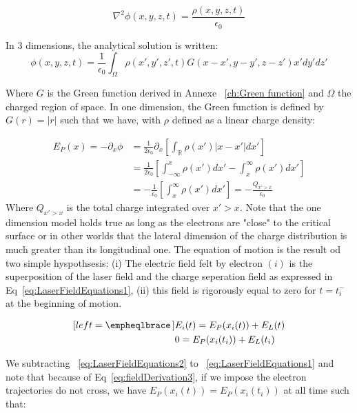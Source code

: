 \begin{equation}
\nabla^2 \phi(x,y,z,t) = \frac{\rho(x,y,z,t)}{\epsilon_0}
\end{equation}

\noindent In 3 dimensions, the analytical solution is written:
$$
\phi(x,y,z,t) =  \frac{1}{\epsilon_0}\int_{\Omega}\rho(x',y',z',t)G(x-x',y-y',z-z')x'dy'dz'
$$

\noindent Where $G$  is the Green function derived in Annexe ~\ref{ch:Green function}  and $\Omega$ the charged region of space. 
In one dimension, the Green function is defined by $G(r) = |r|$ such that we have, with $\rho$ defined as a linear charge density:

\begin{align}
\label{eq:fieldDerivation}
E_P(x) = -\partial_x\phi & =  \frac{1}{2\epsilon_0}\partial_x[\int_{\mathbb{R}}\rho(x')|x-x'|dx'] \\
                                   & =  \frac{1}{2\epsilon_0}[\int_{-\infty}^{x}\rho(x')dx'-\int_{x}^{\infty}\rho(x')dx']\\
                                   & =  -\frac{1}{\epsilon_0}[\int_{x}^{\infty}\rho(x')dx']=  -\frac{Q_{x'>x}}{\epsilon_0} \label{eq:fieldDerivation3}
\end{align}
\noindent Where $Q_{x'>x}$ is the total charge integrated over $x'>x$.
\noindent Note that the one dimension model holds true as long as the electrons are "close" to the critical surface or in other worlds that the lateral dimension of the charge distribution is much greater than its longitudinal one. The equation of motion is the result od two simple hyspothsesis:
(i) The electric field felt by electron $(i)$ is the superposition of the laser field and the charge seperation field as expressed in Eq~\ref{eq:LaserFieldEquations1}, (ii) this field is rigorously equal to zero for $t = t_i^{-}$ at the beginning of motion.
\begin{minipage}[leftmargin = 0pt]{1.04\textwidth}
\begin{subequations}
\begin{align}[left = \empheqlbrace\,]
&E_i(t) = E_P(x_i(t)) + E_L(t)\label{eq:LaserFieldEquations1} \\
&0= E_P(x_i(t_i)) + E_L(t_i)\label{eq:LaserFieldEquations2}
\end{align}
\label{eq:LaserFieldEquations}
\end{subequations}
\end{minipage}

\noindent We subtracting ~\ref{eq:LaserFieldEquations2} to ~\ref{eq:LaserFieldEquations1} and note that because of Eq~\ref{eq:fieldDerivation3}, if we impose the electron trajectories do not cross, we have $E_P(x_i(t)) = E_P(x_i(t_i))$ at all time such that:

